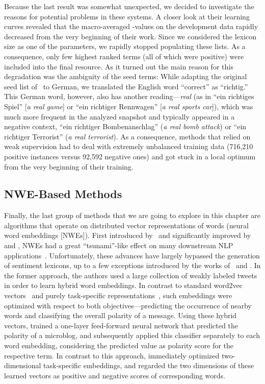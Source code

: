 Because the last result was somewhat unexpected, we decided to
investigate the reasons for potential problems in these systems.  A
closer look at their learning curves revealed that the macro-averaged
\F{}-values on the development data rapidly decreased from the very
beginning of their work.  Since we considered the lexicon size as one
of the parameters, we rapidly stopped populating these lists.  As a
consequence, only few highest ranked terms (all of which were
positive) were included into the final resource.  As it turned out the
main reason for this degradation was the ambiguity of the seed terms:
While adapting the original seed list of~\citet{Turney:03} to German,
we translated the English word ``correct'' as ``richtig.''  This
German word, however, also has another reading---\emph{real} (as in
``ein richtiges Spiel'' [\emph{a real game}] or ``ein richtiger
Rennwagen'' [\emph{a real sports car}]), which was much more frequent
in the analyzed snapshot and typically appeared in a negative context,
\eg{} ``ein richtiger Bombenanschlag'' (\emph{a real bomb attack}) or
``ein richtiger Terrorist'' (\emph{a real terrorist}).  As a
consequence, methods that relied on weak supervision had to deal with
extremely unbalanced training data (716,210 positive instances versus
92,592 negative ones) and got stuck in a local optimum from the very
beginning of their training.

\subsection{NWE-Based Methods}\label{subsec:snt:lex:nwe}

Finally, the last group of methods that we are going to explore in
this chapter are algorithms that operate on distributed vector
representations of words (neural word embeddings [NWEs]).  First
introduced by~\citet{Bengio:03} and significantly improved by
\citet{Collobert:11} and \citet{Mikolov:13}, NWEs had a great
``tsunami''-like effect on many downstream NLP
applications~\cite{Manning:15}.  Unfortunately, these advances have
largely bypassed the generation of sentiment lexicons, up to a few
exceptions introduced by the works of~\citet{Tang:14a} and
\citet{Vo:16}.  In the former approach, the authors used a large
collection of weakly labeled tweets in order to learn hybrid word
embeddings.  In contrast to standard word2vec
vectors~\cite{Mikolov:13} and purely task-specific
representations~\cite{Collobert:11}, such embeddings were optimized
with respect to both objectives---predicting the occurrence of nearby
words and classifying the overall polarity of a message.  Using these
hybrid vectors, \citeauthor{Tang:14a} trained a one-layer feed-forward
neural network that predicted the polarity of a microblog, and
subsequently applied this classifier separately to each word
embedding, considering the predicted value as polarity score for the
respective term.  In contrast to this approach, \citeauthor{Vo:16}
immediately optimized two-dimensional task-specific embeddings, and
regarded the two dimensions of these learned vectors as positive and
negative scores of corresponding words.

